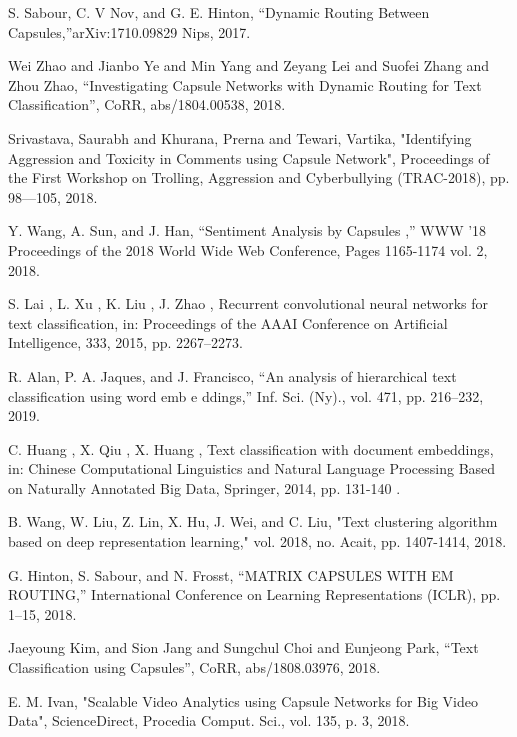 \documentclass[a4paper,12pt]{report}
\begin{document}
\newpage
{}
\renewcommand\bibname{\textbf{REFERENCES}}


\begin{thebibliography}{2}
S. Sabour, C. V Nov, and G. E. Hinton, “Dynamic Routing Between Capsules,”arXiv:1710.09829  Nips, 2017.

Wei Zhao and Jianbo Ye and Min Yang and Zeyang       Lei and Suofei Zhang and Zhou Zhao, “Investigating Capsule Networks with Dynamic Routing for Text Classification”, CoRR, abs/1804.00538, 2018.

Srivastava, Saurabh and Khurana, Prerna and Tewari, Vartika, "Identifying Aggression and Toxicity in Comments using Capsule Network", Proceedings of the First Workshop on Trolling, Aggression and Cyberbullying (TRAC-2018), pp. 98—105, 2018. 


Y. Wang, A. Sun, and J. Han, “Sentiment Analysis by Capsules ,” WWW '18 Proceedings of the 2018 World Wide Web Conference, Pages 1165-1174 vol. 2, 2018.

S. Lai , L. Xu , K. Liu , J. Zhao , Recurrent convolutional neural networks for text classification, in: Proceedings of the AAAI Conference on Artificial Intelligence, 333, 2015, pp. 2267–2273.


R. Alan, P. A. Jaques, and J. Francisco, “An analysis of hierarchical text classification using word emb e ddings,” Inf. Sci. (Ny)., vol. 471, pp. 216–232, 2019.

C. Huang , X. Qiu , X. Huang , Text classification with document embeddings, in: Chinese Computational Linguistics and Natural Language Processing Based on Naturally Annotated Big Data,
Springer, 2014, pp. 131-140 .

B. Wang, W. Liu, Z. Lin, X. Hu, J. Wei, and C. Liu, "Text clustering algorithm based on deep representation learning," vol. 2018, no. Acait, pp. 1407-1414, 2018.

G. Hinton, S. Sabour, and N. Frosst, “MATRIX CAPSULES WITH EM ROUTING,” International Conference on Learning Representations (ICLR), pp. 1–15, 2018.

Jaeyoung Kim, and Sion Jang and Sungchul Choi and              Eunjeong Park, “Text Classification using Capsules”, CoRR, abs/1808.03976, 2018. 

E. M. Ivan, "Scalable Video Analytics using Capsule Networks for Big Video Data", ScienceDirect, Procedia Comput. Sci., vol. 135, p. 3, 2018.


\end{thebibliography}
\end{document}
